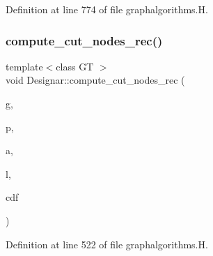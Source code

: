 Definition at line 774 of file graphalgorithms.\+H.

\mbox{\label{namespace_designar_ac547a8b8e0e7a9a8ead8899c02b42128}} 
\subsubsection{\texorpdfstring{compute\+\_\+cut\+\_\+nodes\+\_\+rec()}{compute\_cut\_nodes\_rec()}}
{\footnotesize\ttfamily template$<$class GT $>$ \\
void Designar\+::compute\+\_\+cut\+\_\+nodes\+\_\+rec (\begin{DoxyParamCaption}\item[{\hyperlink{demo-buildgraph_8_c_a3001c40d2c31ca87ed96cd7d1334a55e}{GT} \&}]{g,  }\item[{\hyperlink{namespace_designar_a5af326c65aa2bd26b26c410f2030d09e}{Node}$<$ \hyperlink{demo-buildgraph_8_c_a3001c40d2c31ca87ed96cd7d1334a55e}{GT} $>$ \&}]{p,  }\item[{\hyperlink{namespace_designar_a3f55fb5513d62ff47cbc8f72b8e95d6f}{Arc}$<$ \hyperlink{demo-buildgraph_8_c_a3001c40d2c31ca87ed96cd7d1334a55e}{GT} $>$ \&}]{a,  }\item[{\hyperlink{class_designar_1_1_s_l_list}{S\+L\+List}$<$ \hyperlink{namespace_designar_a5af326c65aa2bd26b26c410f2030d09e}{Node}$<$ \hyperlink{demo-buildgraph_8_c_a3001c40d2c31ca87ed96cd7d1334a55e}{GT} $>$ $\ast$$>$ \&}]{l,  }\item[{\hyperlink{namespace_designar_a9d113d66a39e82b73727c72cd3a52f73}{lint\+\_\+t} \&}]{cdf }\end{DoxyParamCaption})}



Definition at line 522 of file graphalgorithms.\+H.

\mbox{\label{namespace_designar_a8b65b45b1581bbf5b74899490a8b8c61}} 
